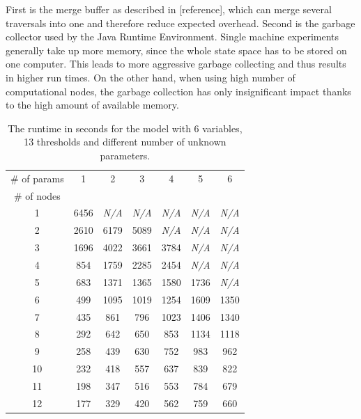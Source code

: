 \documentclass[12pt,oneside, draft]{fithesis2}
\begin{document}
				First is the merge buffer as described in [reference], which can merge several traversals into one and therefore reduce expected overhead. Second is the garbage collector used by the Java Runtime Environment. Single machine experiments generally take up more memory, since the whole state space has to be stored on one computer. This leads to more aggressive garbage collecting and thus results in higher run times. On the other hand, when using high number of computational nodes, the garbage collection has only insignificant impact thanks to the high amount of available memory.
				
				\begin{table}
				\label{tab:param}
					\centering
					\setlength{\tabcolsep}{6pt}
					\begin{tabular}{|*{7}{c|}}
						\hline
							\# of params	& 1 	& 2 	& 3	& 4	& 5	& 6	\\
						\cline{1-1}
							\# of nodes	&	&	&	&	&	&	\\
						\hline
							1 & 6456	& {\em N/A} & {\em N/A} & {\em N/A} & {\em N/A} & {\em N/A} \\
							2	& 2610		& 6179			& 5089			& 	{\em N/A}				&	{\em N/A}					&	{\em N/A}					\\
							3	&	1696		&	4022			&	3661			&	3784			&	{\em N/A}					&	{\em N/A}					\\
							4	&	854			&	1759			&	2285			&	2454			&	{\em N/A}					&	{\em N/A}					\\
							5	&	683			&	1371			&	1365			&	1580			&	1736			&	{\em N/A}					\\
							6	&	499			&	1095			&	1019			&	1254			&	1609			&	1350			\\
							7	&	435			&	861				&	796				&	1023			&	1406			&	1340			\\
							8	&	292			&	642				&	650				&	853				&	1134			&	1118			\\
							9	&	258			&	439				&	630				&	752				&	983				&	962				\\
						 	10	&	232			&	418				&	557				& 637				&	839				&	822				\\
							11	&	198			&	347				&	516				&	553				&	784				&	679				\\
							12	&	177			&	329				&	420				&	562				&	759				&	660				\\
						\hline
					\end{tabular}\\[1em]
					\caption{The runtime in seconds for the model with 6 variables, 13 thresholds and different number of unknown parameters.}				
			\end{table}
\end{document}
